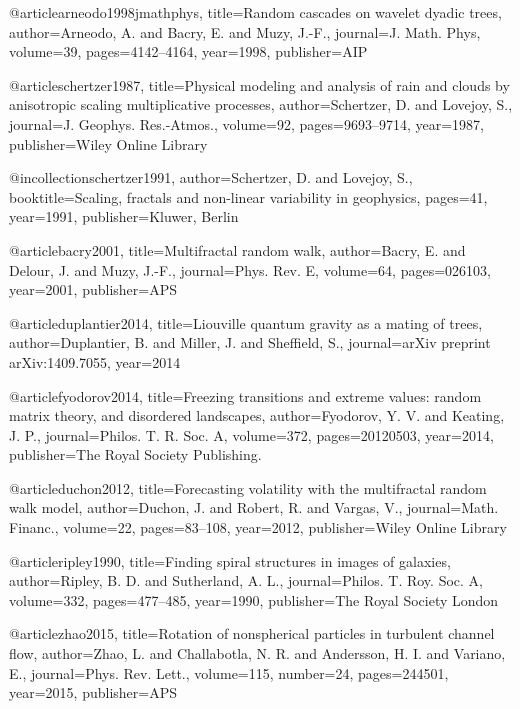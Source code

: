@article{arneodo1998jmathphys,
  title={Random cascades on wavelet dyadic trees},
  author={Arneodo, A. and Bacry, E. and Muzy, J.-F.},
  journal={J. Math. Phys},
  volume={39},
  pages={4142--4164},
  year={1998},
  publisher={AIP}
}

@article{schertzer1987,
  title={Physical modeling and analysis of rain and clouds by anisotropic scaling multiplicative processes},
  author={Schertzer, D. and Lovejoy, S.},
  journal={J. Geophys. Res.-Atmos.},
  volume={92},
  pages={9693--9714},
  year={1987},
  publisher={Wiley Online Library}
}

@incollection{schertzer1991,
  author={Schertzer, D. and Lovejoy, S.},
  booktitle={Scaling, fractals and non-linear variability in geophysics},
  pages={41},
  year={1991},
  publisher={Kluwer, Berlin}
}

@article{bacry2001,
  title={Multifractal random walk},
  author={Bacry, E. and Delour, J. and Muzy, J.-F.},
  journal={Phys. Rev. E},
  volume={64},
  pages={026103},
  year={2001},
  publisher={APS}
}

@article{duplantier2014,
  title={Liouville quantum gravity as a mating of trees},
  author={Duplantier, B. and Miller, J. and Sheffield, S.},
  journal={arXiv preprint arXiv:1409.7055},
  year={2014}
}

@article{fyodorov2014,
  title={Freezing transitions and extreme values: random matrix theory, and disordered landscapes},
  author={Fyodorov, Y. V. and Keating, J. P.},
  journal={Philos. T. R. Soc. A},
  volume={372},
  pages={20120503},
  year={2014},
  publisher={The Royal Society Publishing.}
}

@article{duchon2012,
  title={Forecasting volatility with the multifractal random walk model},
  author={Duchon, J. and Robert, R. and Vargas, V.},
  journal={Math. Financ.},
  volume={22},
  pages={83--108},
  year={2012},
  publisher={Wiley Online Library}
}

@article{ripley1990,
  title={Finding spiral structures in images of galaxies},
  author={Ripley, B. D. and Sutherland, A. L.},
  journal={Philos. T. Roy. Soc. A},
  volume={332},
  pages={477--485},
  year={1990},
  publisher={The Royal Society London}
}

@article{zhao2015,
  title={Rotation of nonspherical particles in turbulent channel flow},
  author={Zhao, L. and Challabotla, N. R. and Andersson, H. I. and Variano, E.},
  journal={Phys. Rev. Lett.},
  volume={115},
  number={24},
  pages={244501},
  year={2015},
  publisher={APS}
}

